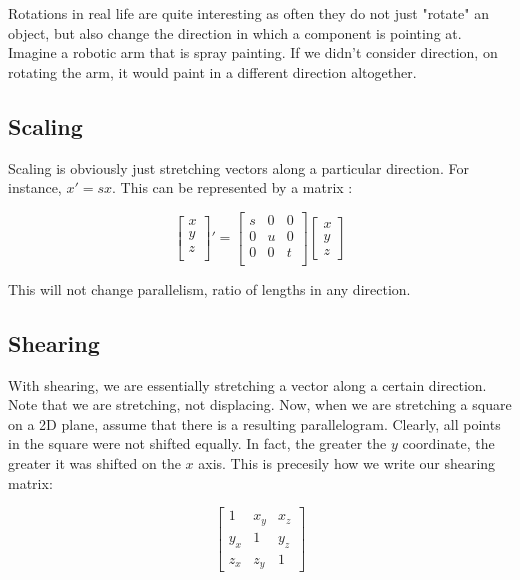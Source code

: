 Rotations in real life are quite interesting as often they do not just "rotate" an object, but also change the direction in which a component is pointing at. Imagine a robotic arm that is spray painting. If we didn't consider direction, on rotating the arm, it would paint in a different direction altogether.

\subsection{Scaling}

Scaling is obviously just stretching vectors along a particular direction. For instance, $x'=sx$. This can be represented by a matrix :

\begin{equation}
    \begin{bmatrix}
    x \\
    y\\
    z\\
    \end{bmatrix}' = \begin{bmatrix}
    s & 0 & 0 \\
    0 & u & 0 \\
    0 & 0 & t \\
    \end{bmatrix} \begin{bmatrix}
    x \\
    y\\
    z
    \end{bmatrix}
\end{equation}

This will not change parallelism, ratio of lengths in any direction.

\subsection{Shearing}

With shearing, we are essentially stretching a vector along a certain direction. Note that we are stretching, not displacing. Now, when we are stretching a square on a 2D plane, assume that there is a resulting parallelogram. Clearly, all points in the square were not shifted equally. In fact, the greater the $y$ coordinate, the greater it was shifted on the $x$ axis. This is precesily how we write our shearing matrix:

\begin{equation}
    \begin{bmatrix}
    1 & x_y & x_z \\
    y_x & 1 & y_z \\
    z_x & z_y & 1
    \end{bmatrix}
\end{equation}


